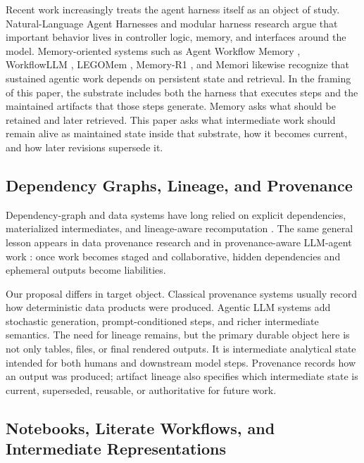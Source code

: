 \documentclass{article}
\begin{document}
Recent work increasingly treats the agent harness itself as an object of study. Natural-Language Agent Harnesses \cite{pan2026nlah} and modular harness research \cite{zhang2025harness} argue that important behavior lives in controller logic, memory, and interfaces around the model. Memory-oriented systems such as Agent Workflow Memory \cite{wang2024awm}, WorkflowLLM \cite{fan2024workflowllm}, LEGOMem \cite{han2025legomem}, Memory-R1 \cite{yan2025memoryr1}, and Memori \cite{borro2026memori} likewise recognize that sustained agentic work depends on persistent state and retrieval. In the framing of this paper, the substrate includes both the harness that executes steps and the maintained artifacts that those steps generate. Memory asks what should be retained and later retrieved. This paper asks what intermediate work should remain alive as maintained state inside that substrate, how it becomes current, and how later revisions supersede it.

\subsection{Dependency Graphs, Lineage, and Provenance}

Dependency-graph and data systems have long relied on explicit dependencies, materialized intermediates, and lineage-aware recomputation \cite{isard2007dryad,zaharia2016spark,airflowdocs,dbtdocs}. The same general lesson appears in data provenance research \cite{buneman2001why,freire2006vistrails} and in provenance-aware LLM-agent work \cite{souza2025provenance}: once work becomes staged and collaborative, hidden dependencies and ephemeral outputs become liabilities.

Our proposal differs in target object. Classical provenance systems usually record how deterministic data products were produced. Agentic LLM systems add stochastic generation, prompt-conditioned steps, and richer intermediate semantics. The need for lineage remains, but the primary durable object here is not only tables, files, or final rendered outputs. It is intermediate analytical state intended for both humans and downstream model steps. Provenance records how an output was produced; artifact lineage also specifies which intermediate state is current, superseded, reusable, or authoritative for future work.

\subsection{Notebooks, Literate Workflows, and Intermediate Representations}
\end{document}
